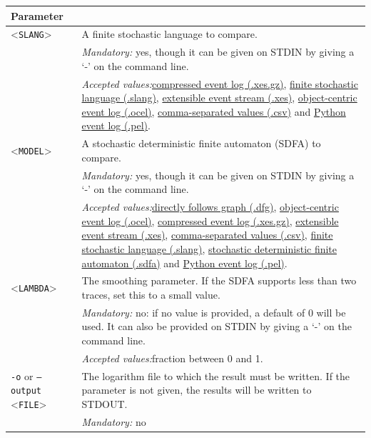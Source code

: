 {\begin{tabularx}{\linewidth}{lX}
\toprule
Parameter \\\midrule
<\texttt{SLANG}>&A finite stochastic language to compare.\\
&\textit{Mandatory:} \quad yes, though it can be given on STDIN by giving a `-' on the command line.\\
&\textit{Accepted values:}\quad \hyperref[filehandler:compressed event log]{compressed event log (.xes.gz)}, \hyperref[filehandler:finite stochastic language]{finite stochastic language (.slang)}, \hyperref[filehandler:extensible event stream]{extensible event stream (.xes)}, \hyperref[filehandler:object-centric event log]{object-centric event log (.ocel)}, \hyperref[filehandler:comma-separated values]{comma-separated values (.csv)} and \hyperref[filehandler:Python event log]{Python event log (.pel)}.\\
<\texttt{MODEL}>&A stochastic deterministic finite automaton (SDFA) to compare.\\
&\textit{Mandatory:} \quad yes, though it can be given on STDIN by giving a `-' on the command line.\\
&\textit{Accepted values:}\quad \hyperref[filehandler:directly follows graph]{directly follows graph (.dfg)}, \hyperref[filehandler:object-centric event log]{object-centric event log (.ocel)}, \hyperref[filehandler:compressed event log]{compressed event log (.xes.gz)}, \hyperref[filehandler:extensible event stream]{extensible event stream (.xes)}, \hyperref[filehandler:comma-separated values]{comma-separated values (.csv)}, \hyperref[filehandler:finite stochastic language]{finite stochastic language (.slang)}, \hyperref[filehandler:stochastic deterministic finite automaton]{stochastic deterministic finite automaton (.sdfa)} and \hyperref[filehandler:Python event log]{Python event log (.pel)}.\\
<\texttt{LAMBDA}>&The smoothing parameter. If the SDFA supports less than two traces, set this to a small value.\\
&\textit{Mandatory:} \quad no: if no value is provided, a default of 0 will be used. It can also be provided on STDIN by giving a `-' on the command line.\\
&\textit{Accepted values:}\quad fraction between 0 and 1.\\
\texttt{-o} or \texttt{--output} <\texttt{FILE}> &
The logarithm file to which the result must be written. If the parameter is not given, the results will be written to STDOUT.\\
&\textit{Mandatory:} \quad no\\

\end{tabularx}}
